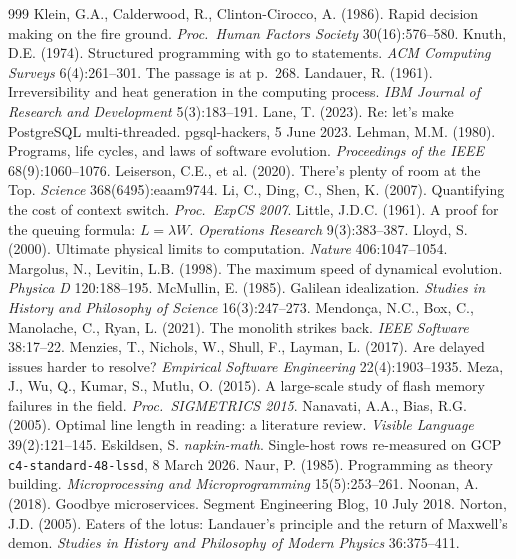 \documentclass[11pt,oneside]{article}
\theoremstyle{definition}
\theoremstyle{remark}
\begin{document}
\begin{thebibliography}{999}
 Klein, G.A., Calderwood, R., Clinton-Cirocco, A. (1986). Rapid decision making on the fire ground. \emph{Proc.\ Human Factors Society} 30(16):576--580.
 Knuth, D.E. (1974). Structured programming with go to statements. \emph{ACM Computing Surveys} 6(4):261--301. The passage is at p.~268.
 Landauer, R. (1961). Irreversibility and heat generation in the computing process. \emph{IBM Journal of Research and Development} 5(3):183--191.
 Lane, T. (2023). Re: let's make PostgreSQL multi-threaded. pgsql-hackers, 5 June 2023.
 Lehman, M.M. (1980). Programs, life cycles, and laws of software evolution. \emph{Proceedings of the IEEE} 68(9):1060--1076.
 Leiserson, C.E., et al. (2020). There's plenty of room at the Top. \emph{Science} 368(6495):eaam9744.
 Li, C., Ding, C., Shen, K. (2007). Quantifying the cost of context switch. \emph{Proc.\ ExpCS 2007}.
 Little, J.D.C. (1961). A proof for the queuing formula: $L=\lambda W$. \emph{Operations Research} 9(3):383--387.
 Lloyd, S. (2000). Ultimate physical limits to computation. \emph{Nature} 406:1047--1054.
 Margolus, N., Levitin, L.B. (1998). The maximum speed of dynamical evolution. \emph{Physica D} 120:188--195.
 McMullin, E. (1985). Galilean idealization. \emph{Studies in History and Philosophy of Science} 16(3):247--273.
 Mendon\c{c}a, N.C., Box, C., Manolache, C., Ryan, L. (2021). The monolith strikes back. \emph{IEEE Software} 38:17--22.
 Menzies, T., Nichols, W., Shull, F., Layman, L. (2017). Are delayed issues harder to resolve? \emph{Empirical Software Engineering} 22(4):1903--1935.
 Meza, J., Wu, Q., Kumar, S., Mutlu, O. (2015). A large-scale study of flash memory failures in the field. \emph{Proc.\ SIGMETRICS 2015}.
 Nanavati, A.A., Bias, R.G. (2005). Optimal line length in reading: a literature review. \emph{Visible Language} 39(2):121--145.
 Eskildsen, S. \emph{napkin-math}. Single-host rows re-measured on GCP \texttt{c4-standard-48-lssd}, 8 March 2026.
 Naur, P. (1985). Programming as theory building. \emph{Microprocessing and Microprogramming} 15(5):253--261.
 Noonan, A. (2018). Goodbye microservices. Segment Engineering Blog, 10 July 2018.
 Norton, J.D. (2005). Eaters of the lotus: Landauer's principle and the return of Maxwell's demon. \emph{Studies in History and Philosophy of Modern Physics} 36:375--411.

\end{thebibliography}
\end{document}
